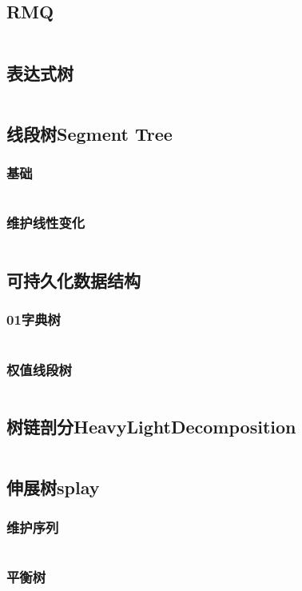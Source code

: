 \documentclass[twoside,sub3section,UTF8]{ctexart}						%
\begin{document}
	\subsection{RMQ}
		\inputminted{c++}{"Data Structure/RMQ.cpp"}
	\subsection{表达式树}
		\inputminted{c++}{"Data Structure/ExpressionTree.cpp"}
	\subsection{线段树Segment Tree}
		\subsubsection{基础}
			\inputminted{c++}{"Data Structure/segmentTree/segmentTree.cpp"}
		\subsubsection{维护线性变化}
			\inputminted{c++}{"Data Structure/segmentTree/pushdown.cpp"}
	\subsection{可持久化数据结构}
		\subsubsection{01字典树}
			\inputminted{c++}{"Data Structure/Presistence/01Dictionary.cpp"}
		\subsubsection{权值线段树}
			\inputminted{c++}{"Data Structure/Presistence/HJT.cpp"}
	\subsection{树链剖分HeavyLightDecomposition}
		\inputminted{c++}{"Data Structure/HeavyLightDecomposition.cpp"}
	\subsection{伸展树splay}
		\subsubsection{维护序列}
		\inputminted{c++}{"Data Structure/splay.cpp"}
		\subsubsection{平衡树}
	
\end{document}
